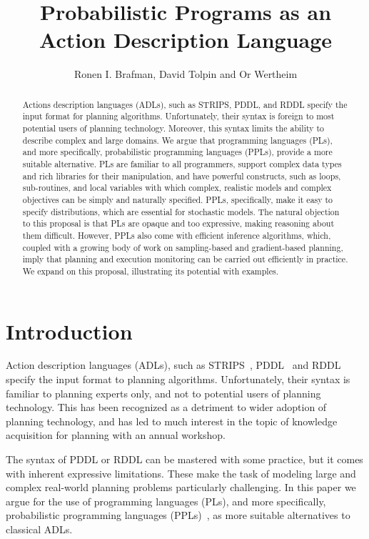 \documentclass[letterpaper]{article} %
\title{Probabilistic Programs as an Action Description Language}
\author{Ronen I. Brafman, David Tolpin and Or Wertheim}
\theoremstyle{definition}
\begin{document}
\maketitle

\begin{abstract}
Actions description languages (ADLs), such as STRIPS, PDDL, and RDDL specify the input format for planning algorithms. Unfortunately, their syntax is foreign to most potential users of planning technology. Moreover, this syntax  limits the ability to describe complex and large domains. We argue that programming languages (PLs), and more specifically, probabilistic programming languages (PPLs), provide a more suitable alternative. PLs are familiar to all programmers, support complex data types and rich libraries for their manipulation, and have powerful constructs, such as loops, sub-routines, and local variables with which complex, realistic models and complex objectives can be simply and naturally specified. PPLs, specifically, make it easy to specify distributions, which are essential for stochastic models. The natural objection to this proposal is that PLs are opaque and too expressive, making reasoning about them difficult. However, PPLs also come with efficient inference algorithms, which, coupled with a growing body of work on sampling-based and gradient-based planning, imply that planning and execution monitoring can be carried out efficiently in practice. We expand on this proposal, illustrating its potential with  examples.
\end{abstract}

\section{Introduction}
Action description languages (ADLs), such as STRIPS~\cite{STRIPS}, PDDL~\cite{PDDL} and  RDDL~\cite{RDDL} specify the input format to planning algorithms. Unfortunately, their syntax is familiar to planning experts only, and not to potential users of planning technology. This has been recognized as a detriment to wider adoption of planning technology, and has led to much interest in the topic of knowledge acquisition for planning with an annual workshop.

The syntax of PDDL or RDDL can be mastered with some practice, but it comes with inherent expressive limitations.
These make the task of modeling large and complex real-world planning problems particularly challenging.
In this paper we argue for the use of
programming languages (PLs), and more specifically, probabilistic programming languages (PPLs)~\cite{GMR+08,MSP14,WVM14,GS15}, as more suitable alternatives to classical ADLs.
\end{document}
